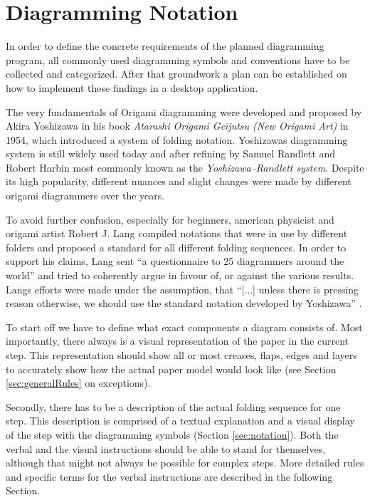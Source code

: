 
\section{Diagramming Notation}
\label{sec:conventions}

In order to define the concrete requirements of the planned diagramming program, all commonly used diagramming symbols and conventions have to be collected and categorized. After that groundwork a plan can be established on how to implement these findings in a desktop application.

The very fundamentals of Origami diagramming were developed and proposed by Akira Yoshizawa in his book \emph{Atarashi Origami Geijutsu (New Origami Art)}\cite{Yoshizawa} in 1954, which introduced a system of folding notation. Yoshizawas diagramming system is still widely used today and after refining by Samuel Randlett and Robert Harbin most commonly known as the \emph{Yoshizawa–Randlett system}. Despite its high popularity, different nuances and slight changes were made by different origami diagrammers over the years.

To avoid further confusion, especially for beginners, american physicist and origami artist Robert J. Lang compiled notations that were in use by different folders and proposed a standard for all different folding sequences. In order to support his claims, Lang sent \enquote{a questionnaire to 25 diagrammers around the world}\cite{Lang} and tried to coherently argue in favour of, or against the various results. Langs efforts were made under the assumption, that \enquote{[...] unless there is pressing reason otherwise, we should use the standard notation developed by Yoshizawa} \cite{Lang}.

To start off we have to define what exact components a diagram consists of. Most importantly, there always is a visual representation of the paper in the current step. This representation should show all or most creases, flaps, edges and layers to accurately show how the actual paper model would look like (see Section \ref{sec:generalRules} on exceptions).

Secondly, there has to be a description of the actual folding sequence for one step. This description is comprised of a textual explanation and a visual display of the step with the diagramming symbols (Section \ref{sec:notation}). Both the verbal and the visual instructions should be able to stand for themselves, although that might not always be possible for complex steps. More detailed rules and specific terms for the verbal instructions are described in the following Section.

